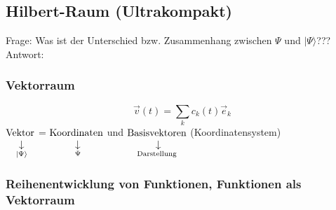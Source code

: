 \subsection{Hilbert-Raum (Ultrakompakt)}
Frage: Was ist der Unterschied bzw. Zusammenhang zwischen $\Psi$ und $|\Psi\rangle$???\\
Antwort:
\subsubsection{Vektorraum}
$$\vec{v}(t) = \sum_k c_k (t) \vec{e}_k$$
$\custo{\rightarrow}{\tx{Vektor}}{\ |\Psi\rangle}$ = $\custo{\rightarrow}{\tx{Koordinaten}}{\ \Psi}$ und $\custo{\rightarrow}{\tx{Basisvektoren}}{\tx{Darstellung}}$ (Koordinatensystem) 

\subsubsection{Reihenentwicklung von Funktionen, Funktionen als Vektorraum}

